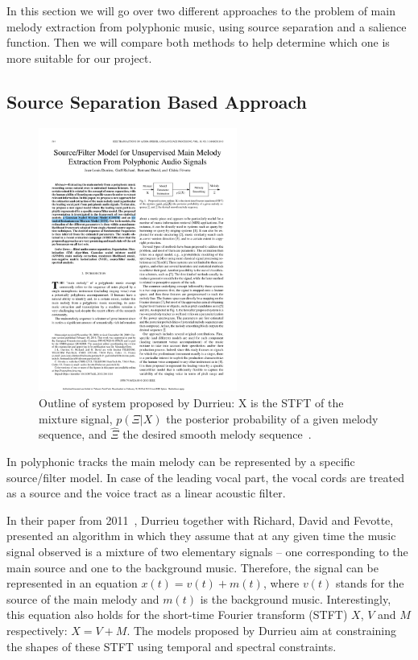 In this section we will go over two different approaches to the problem of main melody extraction from polyphonic music, using source separation and a salience function. Then we will compare both methods to help determine which one is more suitable for our project.

\vspace{10pt}

\subsection{Source Separation Based Approach}

\begin{figure}
\vspace{-30pt}
  \begin{center}
    \includegraphics[width=0.58\textwidth]{Figures/durrieudiagram}
  \end{center}
  \caption{Outline of system proposed by Durrieu: X is the STFT of the mixture signal, $p(\Xi|X)$ the posterior probability of a given melody sequence, and $\hat{\Xi} $ the desired smooth melody sequence~\cite{durrieu}.}
  \label{fig:durrieu}
\end{figure}

In polyphonic tracks the main melody can be represented by a specific source/filter model. In case of the leading vocal part, the vocal cords are treated as a source and the voice tract as a linear acoustic filter.

In their paper from 2011~\cite{durrieu}, Durrieu together with Richard, David and Fevotte, presented an algorithm in which they assume that at any given time the music signal observed is a mixture of two elementary signals -- one corresponding to the main source and one to the background music. Therefore, the signal can be represented in an equation $x(t) = v(t) + m(t)$, where $v(t)$ stands for the source of the main melody and $m(t)$ is the background music. Interestingly, this equation also holds for the short-time Fourier transform (STFT)  $X$, $V$ and $M$ respectively: $X = V + M$. The models proposed by Durrieu aim at constraining the shapes of these STFT using temporal and spectral constraints. 

